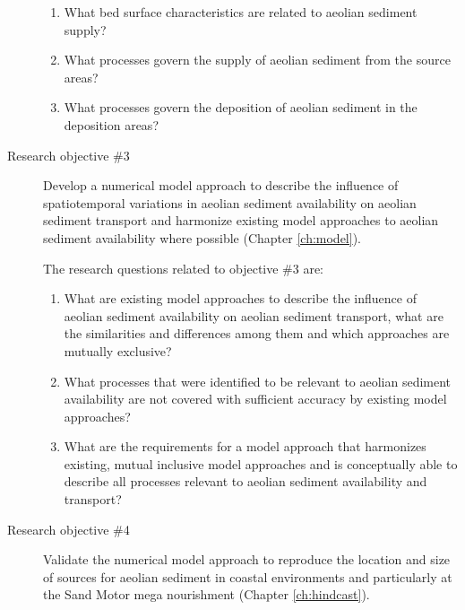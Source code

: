\begin{description}
  \begin{enumerate}[{2.}1]
  \item \label{q:2.2} What bed surface characteristics are related to
    aeolian sediment supply?
  \item \label{q:2.3} What processes govern the supply of aeolian
    sediment from the source areas?
  \item \label{q:2.4} What processes govern the deposition of aeolian
    sediment in the deposition areas?
  \end{enumerate}

  \bigskip

\item[Research objective \#3] Develop a numerical model approach to
  describe the influence of spatiotemporal variations in aeolian
  sediment availability on aeolian sediment transport and harmonize
  existing model approaches to aeolian sediment availability where
  possible (Chapter \ref{ch:model}).

  \medskip

  The research questions related to objective \#3 are:

  \begin{enumerate}[{3.}1]
  \item \label{q:3.1} What are existing model approaches to describe
    the influence of aeolian sediment availability on aeolian sediment
    transport, what are the similarities and differences among them
    and which approaches are mutually exclusive?
  \item \label{q:3.2} What processes that were identified to be
    relevant to aeolian sediment availability are not covered with
    sufficient accuracy by existing model approaches?
  \item \label{q:3.3} What are the requirements for a model approach
    that harmonizes existing, mutual inclusive model approaches and is
    conceptually able to describe all processes relevant to aeolian
    sediment availability and transport?
  \end{enumerate}

  \bigskip

\item[Research objective \#4] Validate the numerical model approach to
  reproduce the location and size of sources for aeolian sediment in
  coastal environments and particularly at the Sand Motor mega
  nourishment (Chapter \ref{ch:hindcast}).


\end{description}

